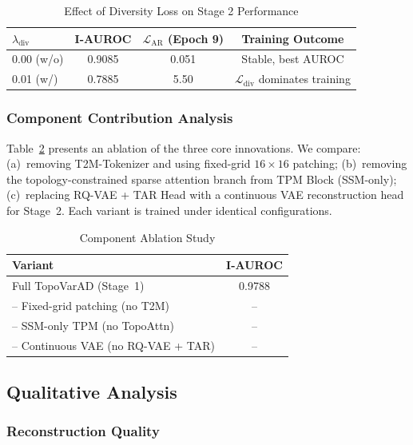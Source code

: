 \documentclass[lettersize,journal]{IEEEtran}
\begin{document}
\begin{table}[!t]
\caption{Effect of Diversity Loss on Stage 2 Performance\label{tab:div_ablation}}
\centering
\begin{tabular}{@{}lccc@{}}
\toprule
$\lambda_{\text{div}}$ & \textbf{I-AUROC} & $\mathcal{L}_{\text{AR}}$ (Epoch 9) & \textbf{Training Outcome} \\
\midrule
0.00 (w/o) & 0.9085 & 0.051 & Stable, best AUROC \\
0.01 (w/)  & 0.7885 & 5.50 & $\mathcal{L}_{\text{div}}$ dominates training \\
\bottomrule
\end{tabular}
\end{table}

\subsubsection{Component Contribution Analysis}

Table~\ref{tab:component} presents an ablation of the three core innovations. We compare: (a)~removing T2M-Tokenizer and using fixed-grid $16 \times 16$ patching; (b)~removing the topology-constrained sparse attention branch from TPM Block (SSM-only); (c)~replacing RQ-VAE + TAR Head with a continuous VAE reconstruction head for Stage~2. Each variant is trained under identical configurations.

\begin{table}[!t]
\caption{Component Ablation Study\label{tab:component}}
\centering
\begin{tabular}{@{}lc@{}}
\toprule
\textbf{Variant} & \textbf{I-AUROC} \\
\midrule
Full TopoVarAD (Stage~1) & 0.9788 \\
-- Fixed-grid patching (no T2M) & -- \\
-- SSM-only TPM (no TopoAttn) & -- \\
-- Continuous VAE (no RQ-VAE + TAR) & -- \\
\bottomrule
\end{tabular}
\end{table}

\subsection{Qualitative Analysis}

\subsubsection{Reconstruction Quality}
\end{document}
